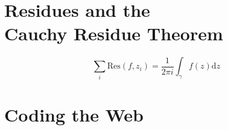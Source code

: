 \documentclass[10pt]{article}
\begin{document}
\section{Residues and the\\Cauchy Residue Theorem}
\lipsum[2]

\begin{equation}
\sum_i  \mathrm{Res}\left(f, z_i\right) = \frac{1}{2\pi i} \int_\gamma f(z) \mathrm{d}z
\end{equation}

\section{Coding the Web}
\texttt{\lipsum[1]}
\end{document}
